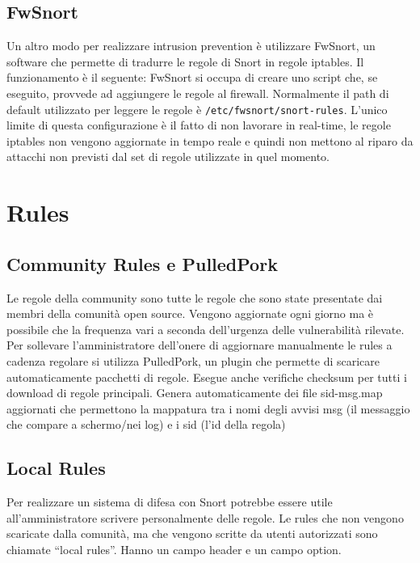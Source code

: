 \subsection{FwSnort}

Un altro modo per realizzare intrusion prevention è utilizzare FwSnort, un software che permette di tradurre le regole di Snort in regole iptables. Il funzionamento è il seguente: FwSnort si occupa di creare uno script che, se eseguito, provvede ad aggiungere le regole al firewall. Normalmente il path di default utilizzato per leggere le regole è \texttt{/etc/fwsnort/snort-rules}. L'unico limite di questa configurazione è il fatto di non lavorare in real-time, le regole iptables non vengono aggiornate in tempo reale e quindi non mettono al riparo da attacchi non previsti dal set di regole utilizzate in quel momento.

\section{Rules}

\subsection{Community Rules e PulledPork}

Le regole della community sono tutte le regole che sono state presentate dai membri della comunità open source. Vengono aggiornate ogni giorno ma è possibile che la frequenza vari a seconda dell'urgenza delle vulnerabilità rilevate. Per sollevare l'amministratore dell'onere di aggiornare manualmente le rules a cadenza regolare si utilizza PulledPork, un plugin che permette di scaricare automaticamente pacchetti di regole. Esegue anche verifiche checksum per tutti i download di regole principali. Genera automaticamente dei file sid-msg.map aggiornati che permettono la mappatura tra i nomi degli avvisi msg (il messaggio che compare a schermo/nei log) e i sid (l'id della regola)

\subsection{Local Rules}

Per realizzare un sistema di difesa con Snort potrebbe essere utile all'amministratore scrivere personalmente delle regole. Le rules che non vengono scaricate dalla comunità, ma che vengono scritte da utenti autorizzati sono chiamate ``local rules''.
Hanno un campo header e un campo option.

